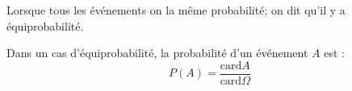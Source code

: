 


 \summary{}
   \begin{definition}
   Lorsque tous les événements on la même probabilité; on dit qu'il y a équiprobabilité.
  \end{definition}

  
  \begin{proposition}
  Dans un cas d'équiprobabilité, la probabilité d'un événement $A$ est : $$ P(A)=\frac{\text{card}A }{\text{card}\Omega}$$
  \end{proposition}

  


